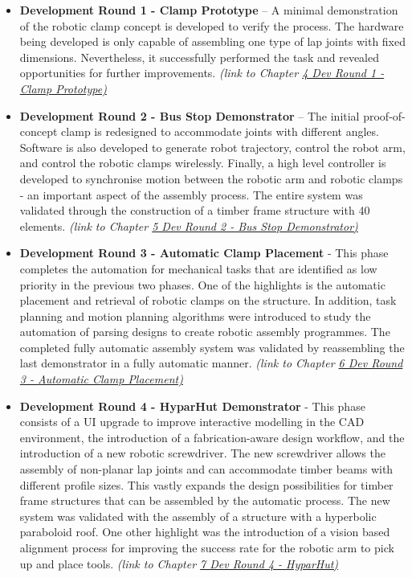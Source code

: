 \documentclass[11pt]{book}
\begin{document}
\begin{itemize}
	\item \textbf{Development Round 1 - Clamp Prototype }– A minimal demonstration of the robotic clamp concept is developed to verify the process. The hardware being developed is only capable of assembling one type of lap joints with fixed dimensions. Nevertheless, it successfully performed the task and revealed opportunities for further improvements. \textit{(link to Chapter \underline{4 Dev Round 1 - Clamp Prototype)}}

	\item \textbf{Development Round 2 - Bus Stop Demonstrator }– The initial proof-of-concept clamp is redesigned to accommodate joints with different angles. Software is also developed to generate robot trajectory, control the robot arm, and control the robotic clamps wirelessly. Finally, a high level controller is developed to synchronise motion between the robotic arm and robotic clamps - an important aspect of the assembly process. The entire system was validated through the construction of a timber frame structure with 40 elements. \textit{(link to Chapter \underline{5 Dev Round 2 - Bus Stop Demonstrator)}}

	\item \textbf{Development Round 3 - Automatic Clamp Placement} - This phase completes the automation for mechanical tasks that are identified as low priority in the previous two phases. One of the highlights is the automatic placement and retrieval of robotic clamps on the structure. In addition, task planning and motion planning algorithms were introduced to study the automation of parsing designs to create robotic assembly programmes. The completed fully automatic assembly system was validated by reassembling the last demonstrator in a fully automatic manner.  \textit{(link to Chapter \underline{6 Dev Round 3 - Automatic Clamp Placement)}}

	\item \textbf{Development Round 4 - HyparHut Demonstrator} - This phase consists of a UI upgrade to improve interactive modelling in the CAD environment, the introduction of a fabrication-aware design workflow, and the introduction of a new robotic screwdriver. The new screwdriver allows the assembly of non-planar lap joints and can accommodate timber beams with different profile sizes. This vastly expands the design possibilities for timber frame structures that can be assembled by the automatic process. The new system was validated with the assembly of a structure with a hyperbolic paraboloid roof. One other highlight was the introduction of a vision based alignment process for improving the success rate for the robotic arm to pick up and place tools. \textit{(link to Chapter \underline{7 Dev Round 4 - HyparHut) }}


\end{itemize}
\end{document}
